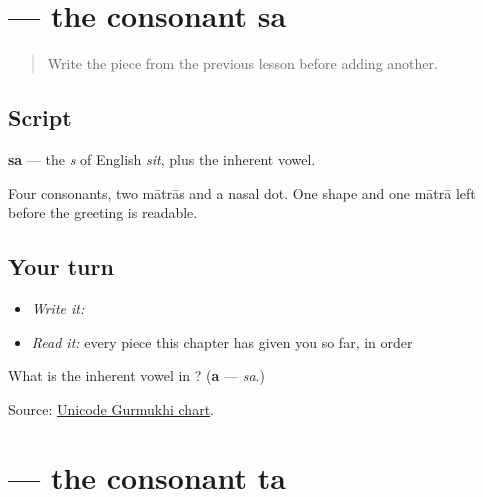 \section[\texorpdfstring{\pa{ਸ} (sa)}{ਸ (sa)}]{ — the consonant sa}

\label{lesson:PA-W01-sa}



\begin{quote}
Write the piece from the previous lesson before adding another.
\end{quote}

\subsection*{Script}

\begin{quote}
\end{quote}

\textbf{sa} — the \emph{s} of English \emph{sit}, plus the inherent vowel.

Four consonants, two mātrās and a nasal dot. One shape and one mātrā left before the greeting is readable.

\subsection*{Your turn}
\begin{itemize}
\raggedright
  \item \emph{Write it:} 
  \item \emph{Read it:} every piece this chapter has given you so far, in order
\end{itemize}

\begin{tcolorbox}[breakable,colback=teal!4,colframe=teal!35!black,title={Before you move on}]
What is the inherent vowel in \textbf{}? (\textbf{a} — \emph{sa}.)

Source: \href{https://www.unicode.org/charts/PDF/U0A00.pdf}{Unicode Gurmukhi chart}.
\end{tcolorbox}
\section[\texorpdfstring{\pa{ਤ} (ta)}{ਤ (ta)}]{ — the consonant ta}

\label{lesson:PA-W01-ta}



